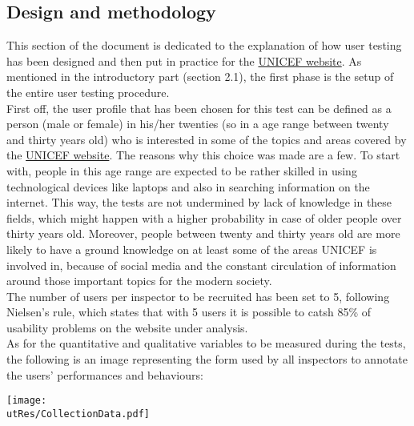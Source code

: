 
\subsection{Design and methodology}
This section of the document is dedicated to the explanation of how user testing has been designed and then put in practice for the \href{https://www.unicef.org/}{UNICEF website}.
As mentioned in the introductory part (section 2.1), the first phase is the setup of the entire user testing procedure.\\
First off, the user profile that has been chosen for this test can be defined as a person (male or female) in his/her twenties (so in a age range between twenty and thirty years old) who is interested in some of the topics and areas covered by the \href{https://www.unicef.org/}{UNICEF website}. The reasons why this choice was made are a few. To start with, people in this age range are expected to be rather skilled in using technological devices like laptops and also in searching information on the internet. This way, the tests are not undermined by lack of knowledge in these fields, which might happen with a higher probability in case of older people over thirty years old. Moreover, people between twenty and thirty years old are more likely to have a ground knowledge on at least some of the areas UNICEF is involved in, because of social media and the constant circulation of information around those important topics for the modern society.\\
The number of users per inspector to be recruited has been set to 5, following Nielsen's rule, which states that with 5 users it is possible to catsh 85\% of usability problems on the website under analysis.\\
As for the quantitative and qualitative variables to be measured during the tests, the following is an image representing the form used by all inspectors to annotate the users' performances and behaviours:

\begin{center}
	\texttt{[image: \\utRes/CollectionData.pdf]}
\end{center}

